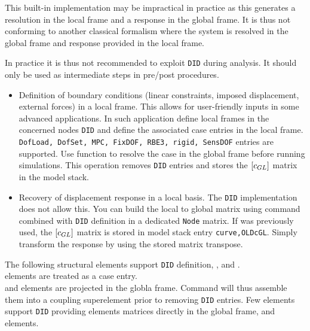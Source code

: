 \begin{SDT}
This built-in implementation may be impractical in practice as this generates a resolution in the local frame and a response in the global frame. It is thus not conforming to another classical formalism where the system is resolved in the global frame and response provided in the local frame.

In practice it is thus not recommended to exploit {\tt DID} during analysis. It should only be used as intermediate steps in pre/post procedures.
\begin{itemize}
\item Definition of boundary conditions (linear constraints, imposed displacement, external forces) in a local frame. This allows for user-friendly inputs in some advanced applications. In such application define local frames in the concerned nodes {\tt DID} and define the associated case entries in the local frame. {\tt DofLoad, DofSet, MPC, FixDOF, RBE3, rigid, SensDOF} entries are supported. Use function  to resolve the case in the global frame before running simulations. This operation removes {\tt DID} entries and stores the $\left[c_{GL}\right]$ matrix in the model stack.
\item Recovery of displacement response in a local basis. The {\tt DID} implementation does not allow this. You can build the local to global matrix using  command combined with {\tt DID} definition in a dedicated {\tt Node} matrix. If  was previously used, the $\left[c_{GL}\right]$ matrix is stored in model stack entry {\tt curve,OLDcGL}. Simply transform the response by using the stored matrix transpose.
\end{itemize}

The following structural elements support {\tt DID} definition, \rigid, \celas and \massb.\\
\rigid elements are treated as a case entry.\\
\celas and \massb elements are projected in the globla frame. Command  will thus assemble them into a coupling superelement prior to removing {\tt DID} entries.
Few elements support {\tt DID} providing elements matrices directly in the global frame, \celas and \massb elements.

\end{SDT}



